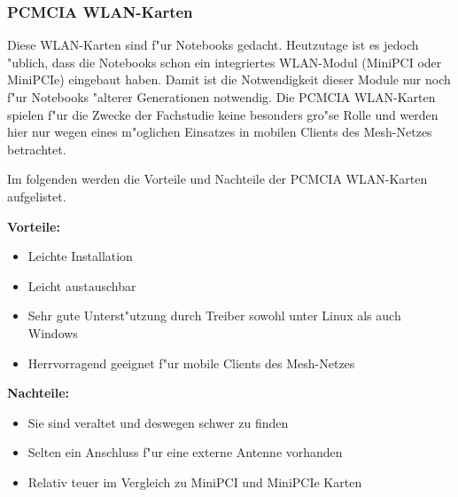 \newpage
\subsubsection{PCMCIA WLAN-Karten}

Diese WLAN-Karten sind f"ur Notebooks gedacht. Heutzutage ist es jedoch
"ublich, dass die Notebooks schon ein integriertes WLAN-Modul
(MiniPCI oder MiniPCIe) eingebaut haben. Damit ist die Notwendigkeit
dieser Module nur noch f"ur Notebooks "alterer Generationen notwendig.
Die PCMCIA WLAN-Karten spielen f"ur die Zwecke der Fachstudie keine
besonders gro"se Rolle und werden hier nur wegen eines m"oglichen
Einsatzes in mobilen Clients des Mesh-Netzes betrachtet.

Im folgenden werden die Vorteile und Nachteile der PCMCIA WLAN-Karten
aufgelistet.

\textbf{Vorteile:}

\begin{itemize}
	\item Leichte Installation
	\item Leicht austauschbar
	\item Sehr gute Unterst"utzung durch Treiber sowohl unter Linux als
	auch Windows
	\item Herrvorragend geeignet f"ur mobile Clients des Mesh-Netzes
\end{itemize}

\textbf{Nachteile:}

\begin{itemize}
	\item Sie sind veraltet und deswegen schwer zu finden
	\item Selten ein Anschluss f"ur eine externe Antenne vorhanden
	\item Relativ teuer im Vergleich zu MiniPCI und MiniPCIe Karten
\end{itemize}

